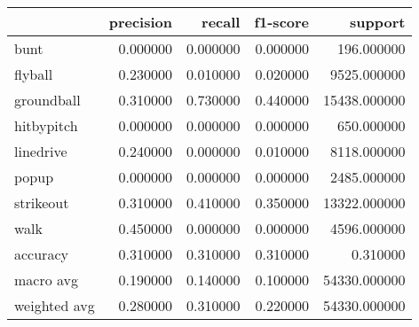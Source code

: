 \begin{tabular}{lrrrr}
\toprule
 & precision & recall & f1-score & support \\
\midrule
bunt & 0.000000 & 0.000000 & 0.000000 & 196.000000 \\
flyball & 0.230000 & 0.010000 & 0.020000 & 9525.000000 \\
groundball & 0.310000 & 0.730000 & 0.440000 & 15438.000000 \\
hitbypitch & 0.000000 & 0.000000 & 0.000000 & 650.000000 \\
linedrive & 0.240000 & 0.000000 & 0.010000 & 8118.000000 \\
popup & 0.000000 & 0.000000 & 0.000000 & 2485.000000 \\
strikeout & 0.310000 & 0.410000 & 0.350000 & 13322.000000 \\
walk & 0.450000 & 0.000000 & 0.000000 & 4596.000000 \\
accuracy & 0.310000 & 0.310000 & 0.310000 & 0.310000 \\
macro avg & 0.190000 & 0.140000 & 0.100000 & 54330.000000 \\
weighted avg & 0.280000 & 0.310000 & 0.220000 & 54330.000000 \\
\bottomrule
\end{tabular}
